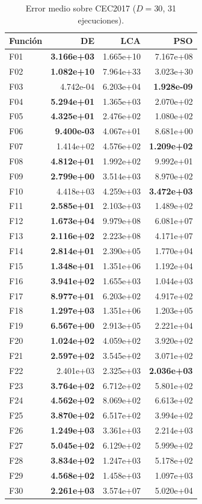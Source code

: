 \begin{table}[h!]
\centering
\caption{Error medio sobre CEC2017 ($D=30$, 31 ejecuciones).}
\label{tab:res_d30}
\footnotesize
\renewcommand{\arraystretch}{1.1}
\begin{tabular}{@{}lrrr@{}}
\toprule
\textbf{Función} & \textbf{DE} & \textbf{LCA} & \textbf{PSO} \\
\midrule
F01 & \textbf{3.166e+03} & 1.665e+10 & 7.167e+08 \\
F02 & \textbf{1.082e+10} & 7.964e+33 & 3.023e+30 \\
F03 & 4.742e-04 & 6.203e+04 & \textbf{1.928e-09} \\
F04 & \textbf{5.294e+01} & 1.365e+03 & 2.070e+02 \\
F05 & \textbf{4.325e+01} & 2.476e+02 & 1.080e+02 \\
F06 & \textbf{9.400e-03} & 4.067e+01 & 8.681e+00 \\
F07 & 1.414e+02 & 4.576e+02 & \textbf{1.209e+02} \\
F08 & \textbf{4.812e+01} & 1.992e+02 & 9.992e+01 \\
F09 & \textbf{2.799e+00} & 3.514e+03 & 8.970e+02 \\
F10 & 4.418e+03 & 4.259e+03 & \textbf{3.472e+03} \\
F11 & \textbf{2.585e+01} & 2.103e+03 & 1.489e+02 \\
F12 & \textbf{1.673e+04} & 9.979e+08 & 6.081e+07 \\
F13 & \textbf{2.116e+02} & 2.223e+08 & 4.171e+07 \\
F14 & \textbf{2.814e+01} & 2.390e+05 & 1.770e+04 \\
F15 & \textbf{1.348e+01} & 1.351e+06 & 1.192e+04 \\
F16 & \textbf{3.941e+02} & 1.655e+03 & 1.044e+03 \\
F17 & \textbf{8.977e+01} & 6.203e+02 & 4.917e+02 \\
F18 & \textbf{1.297e+03} & 1.351e+06 & 1.203e+05 \\
F19 & \textbf{6.567e+00} & 2.913e+05 & 2.221e+04 \\
F20 & \textbf{1.024e+02} & 4.059e+02 & 3.920e+02 \\
F21 & \textbf{2.597e+02} & 3.545e+02 & 3.071e+02 \\
F22 & 2.401e+03 & 2.325e+03 & \textbf{2.036e+03} \\
F23 & \textbf{3.764e+02} & 6.712e+02 & 5.801e+02 \\
F24 & \textbf{4.562e+02} & 8.069e+02 & 6.613e+02 \\
F25 & \textbf{3.870e+02} & 6.517e+02 & 3.994e+02 \\
F26 & \textbf{1.249e+03} & 3.361e+03 & 2.214e+03 \\
F27 & \textbf{5.045e+02} & 6.129e+02 & 5.999e+02 \\
F28 & \textbf{3.834e+02} & 1.247e+03 & 5.178e+02 \\
F29 & \textbf{4.568e+02} & 1.458e+03 & 1.097e+03 \\
F30 & \textbf{2.261e+03} & 3.574e+07 & 5.020e+04 \\
\bottomrule
\end{tabular}
\end{table}

